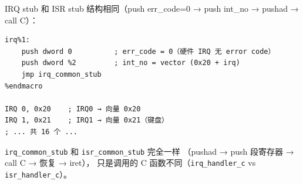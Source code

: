 IRQ stub 和 ISR stub 结构相同（push err\_code=0 → push int\_no → pushad → call C）：

\begin{lstlisting}[style=nasmstyle]
%macro IRQ 2
irq%1:
    push dword 0          ; err_code = 0（硬件 IRQ 无 error code）
    push dword %2         ; int_no = vector (0x20 + irq)
    jmp irq_common_stub
%endmacro

IRQ 0, 0x20    ; IRQ0 → 向量 0x20
IRQ 1, 0x21    ; IRQ1 → 向量 0x21（键盘）
; ... 共 16 个 ...
\end{lstlisting}

\texttt{irq\_common\_stub} 和 \texttt{isr\_common\_stub} 完全一样
（pushad → push 段寄存器 → call C → 恢复 → iret），
只是调用的 C 函数不同（\texttt{irq\_handler\_c} vs \texttt{isr\_handler\_c}）。


